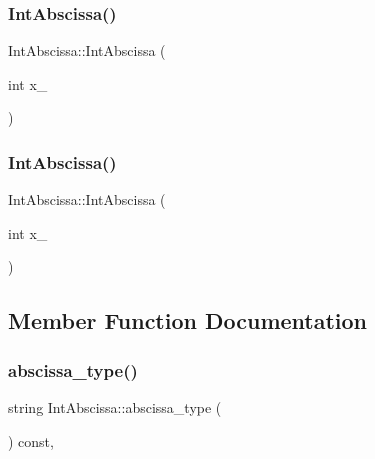 \subsubsection{\texorpdfstring{IntAbscissa()}{IntAbscissa()}\hspace{0.1cm}{\footnotesize\ttfamily [1/2]}}
{\footnotesize\ttfamily Int\+Abscissa\+::\+Int\+Abscissa (\begin{DoxyParamCaption}\item[{int}]{x\+\_\+ }\end{DoxyParamCaption})\hspace{0.3cm}{\ttfamily [inline]}}

\mbox{\label{classIntAbscissa_a4c026235c38283134e66424a5f61cd25}} 
\subsubsection{\texorpdfstring{IntAbscissa()}{IntAbscissa()}\hspace{0.1cm}{\footnotesize\ttfamily [2/2]}}
{\footnotesize\ttfamily Int\+Abscissa\+::\+Int\+Abscissa (\begin{DoxyParamCaption}\item[{int}]{x\+\_\+ }\end{DoxyParamCaption})\hspace{0.3cm}{\ttfamily [inline]}}



\subsection{Member Function Documentation}
\mbox{\label{classIntAbscissa_a3d21dd199d2e7623429fadce5092ac88}} 
\subsubsection{\texorpdfstring{abscissa\_type()}{abscissa\_type()}\hspace{0.1cm}{\footnotesize\ttfamily [1/2]}}
{\footnotesize\ttfamily string Int\+Abscissa\+::abscissa\+\_\+type (\begin{DoxyParamCaption}{ }\end{DoxyParamCaption}) const\hspace{0.3cm}{\ttfamily [inline]}, {\ttfamily [virtual]}}



